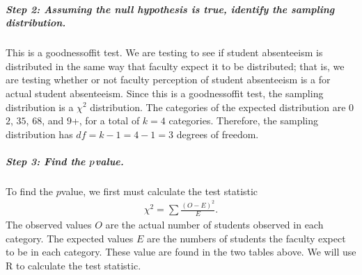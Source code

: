 \documentclass[letterpaper,10pt,english]{jupyterBook}
\begin{document}
\subparagraph{Step 2: Assuming the null hypothesis is true, identify the sampling distribution.}
\label{\detokenize{Ch7 The Chi-Square Distribution/7.3 Goodness-of-Fit Test:step-2-assuming-the-null-hypothesis-is-true-identify-the-sampling-distribution}}
\sphinxAtStartPar
This is a goodness\sphinxhyphen{}of\sphinxhyphen{}fit test. We are testing to see if student absenteeism is distributed in the same way that faculty expect it to be distributed; that is, we are testing whether or not faculty perception of student absenteeism is a  for actual student absenteeism. Since this is a goodness\sphinxhyphen{}of\sphinxhyphen{}fit test, the sampling distribution is a \(\chi^2\) distribution. The categories of the expected distribution are \(0\)\sphinxhyphen{}\(2\), \(3\)\sphinxhyphen{}\(5\), \(6\)\sphinxhyphen{}\(8\), and \(9\)+, for a total of \(k = 4\) categories. Therefore, the sampling distribution has \(df = k - 1 = 4 - 1 = 3\) degrees of freedom.


\subparagraph{Step 3: Find the  \protect\(p\protect\)\sphinxhyphen{}value.}
\label{\detokenize{Ch7 The Chi-Square Distribution/7.3 Goodness-of-Fit Test:step-3-find-the-p-value}}
\sphinxAtStartPar
To find the \(p\)\sphinxhyphen{}value, we first must calculate the test statistic
\begin{equation*}
\begin{split} \chi^2 = \sum \frac{(O - E)^2}{E}. \end{split}
\end{equation*}
\sphinxAtStartPar
The observed values \(O\) are the actual number of students observed in each category. The expected values \(E\) are the numbers of students the faculty expect to be in each category. These value are found in the two tables above. We will use R to calculate the test statistic.
\end{document}
